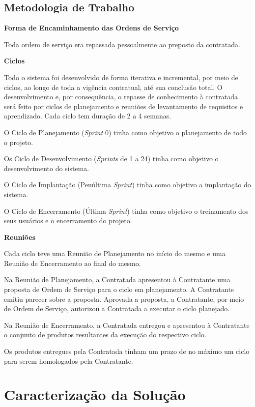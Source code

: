 \subsection[Metodologia de Trabalho]{Metodologia de Trabalho}

\textbf{Forma de Encaminhamento das Ordens de Serviço}

Toda ordem de serviço era repassada pessoalmente ao preposto da contratada.

\textbf{Ciclos}

Todo o sistema foi desenvolvido de forma iterativa e incremental, por meio de ciclos, ao longo de toda a vigência contratual, até sua conclusão total. O desenvolvimento e, por consequência, o repasse de conhecimento à contratada será feito por ciclos de planejamento e reuniões de levantamento de requisitos e aprendizado. Cada ciclo tem duração de 2 a 4 semanas.

O Ciclo de Planejamento (\textit{Sprint} 0) tinha como objetivo o planejamento de todo o projeto.

Os Ciclo de Desenvolvimento (\textit{Sprints} de 1 a 24) tinha como objetivo o desenvolvimento do sistema.

O Ciclo de Implantação (Penúltima \textit{Sprint}) tinha como objetivo a implantação do sistema.

O Ciclo de Encerramento (Última \textit{Sprint}) tinha como objetivo o treinamento dos seus usuários e o encerramento do projeto.

\textbf{Reuniões}

Cada ciclo teve uma Reunião de Planejamento no início do mesmo e uma Reunião de Encerramento ao final do mesmo.

Na Reunião de Planejamento, a Contratada apresentou à Contratante uma proposta de Ordem de Serviço para o ciclo em planejamento. A Contratante emitiu parecer sobre a proposta. Aprovada a proposta, a Contratante, por meio de Ordem de Serviço, autorizou a Contratada a executar o ciclo planejado.

Na Reunião de Encerramento, a Contratada entregou e apresentou à Contratante o conjunto de produtos resultantes da execução do respectivo ciclo.

Os produtos entregues pela Contratada tinham um prazo de no máximo um ciclo para serem homologados pela Contratante.

\section[Caracterização da Solução]{Caracterização da Solução}

